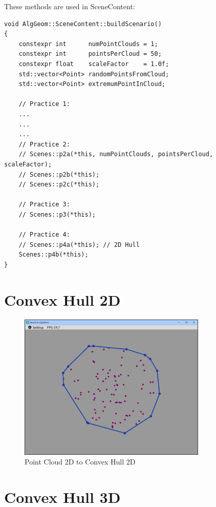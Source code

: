 \documentclass[12pt,a4paper,english]{article}
\begin{document}
These methods are used in SceneContent:

\begin{verbatim}
void AlgGeom::SceneContent::buildScenario()
{
    constexpr int      numPointClouds = 1;
    constexpr int      pointsPerCloud = 50;
    constexpr float    scaleFactor    = 1.0f;
    std::vector<Point> randomPointsFromCloud;
    std::vector<Point> extremumPointInCloud;

    // Practice 1:
    ...
    ...
    ...
    // Practice 2:
    // Scenes::p2a(*this, numPointClouds, pointsPerCloud, scaleFactor);
    // Scenes::p2b(*this);
    // Scenes::p2c(*this);

    // Practice 3:
    // Scenes::p3(*this);

    // Practice 4:
    // Scenes::p4a(*this); // 2D Hull
    Scenes::p4b(*this);
}
\end{verbatim}

\newpage

\section{Convex Hull 2D}

\begin{figure}[H]
    \centering
    \includegraphics[width=0.8\textwidth]{p4-1}
    \caption[]{Point Cloud 2D to Convex Hull 2D}
    \label{fig:p4-1}
\end{figure}

\newpage

\section{Convex Hull 3D}
\end{document}
